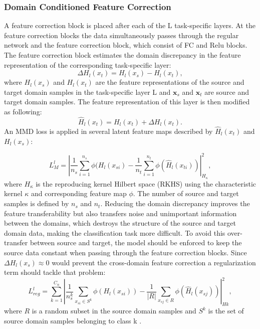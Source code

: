 {\subsubsection{Domain Conditioned Feature Correction}
A feature correction block is placed after each of the L task-specific layers. At the feature correction blocks the data simultaneously passes through the regular network and the feature correction block, which consist of FC and Relu blocks. The feature correction block estimates the domain discrepancy in the feature representation of the corresponding task-specific layer:
\begin{equation}
    \Delta H_{l}(x_{t}) = H_{l}(x_{s}) - H_{l}(x_{t}),
\end{equation}
where $H_{l}(x_{s})$ and $H_{l}(x_{t})$ are the feature representations of the source and target domain samples in the task-specific layer L and $\pmb{x}_{s}$ and $\pmb{x}_{t}$ are source and target domain samples. The feature representation of this layer is then modified as following:
\begin{equation}
    \hat{H}_{l}(x_{t}) = H_{l}(x_{t}) + \Delta H_{l}(x_{t}).
\end{equation}
An MMD loss is applied in several latent feature maps described by $\hat{H}_{l}(x_{t})$ and $H_{l}(x_{s})$:

\begin{equation}
    L_{M}^{l} = |\frac{1}{n_s} \sum_{i=1}^{n_{s}} \phi(H_{l}(x_{si}) - \frac{1}{n_t} \sum_{i=1}^{n_{t}} \phi(\hat{H}_{l}(x_{ti}))|_{H_{\kappa}}^{2}, 
\end{equation}
where $H_{\kappa}$ is the reproducing kernel Hilbert space (RKHS) using the characteristic kernel $\kappa$ and corresponding feature map  $\phi$. The number of source and target samples is defined by $n_{s}$ and $n_{t}$. Reducing the domain discrepancy improves the feature transferability but also transfers noise and unimportant information between the domains, which destroys the structure of the source and target domain data, making the classification task more difficult. To avoid this over-transfer between source and target, the model should be enforced to keep the source data constant when passing through the feature correction blocks. Since $\Delta H_{l}(x_{s}) \approx 0$ would prevent the cross-domain feature correction a regularization term should tackle that problem:
\begin{equation}
    L_{reg}^{l} = \sum_{k=1}^{C_{n}}|\frac{1}{n_{s}^{k}} \sum_{x_{si} \in S^{k}} \phi(H_{l}(x_{si})) - \frac{1}{|R|} \sum_{x_{sj} \in R} \phi(\hat{H}_{l}(x_{sj}))|_{Hk}^{2}, 
\end{equation}
where $R$ is a random subset in the source domain samples and $S^{k}$ is the set of source domain samples belonging to class k \cite{li2020}.

}

